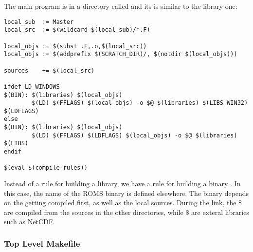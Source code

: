 The main program is in a directory called  and its
 is similar to the library one:
\begin{verbatim}
local_sub  := Master
local_src  := $(wildcard $(local_sub)/*.F)

local_objs := $(subst .F,.o,$(local_src))
local_objs := $(addprefix $(SCRATCH_DIR)/, $(notdir $(local_objs)))

sources    += $(local_src)

ifdef LD_WINDOWS
$(BIN): $(libraries) $(local_objs)
        $(LD) $(FFLAGS) $(local_objs) -o $@ $(libraries) $(LIBS_WIN32) $(LDFLAGS)
else
$(BIN): $(libraries) $(local_objs)
        $(LD) $(FFLAGS) $(LDFLAGS) $(local_objs) -o $@ $(libraries) $(LIBS)
endif

$(eval $(compile-rules))
\end{verbatim}
Instead of a rule for building a library, we have a rule for building
a binary . In this case, the name of the ROMS binary
is defined elsewhere. The binary depends
on the  getting compiled first, as well as the local
sources. During the link, the \$ are compiled from
the sources in the other directories, while \$ are exteral
libraries such as NetCDF.

\subsubsection{Top Level Makefile}

